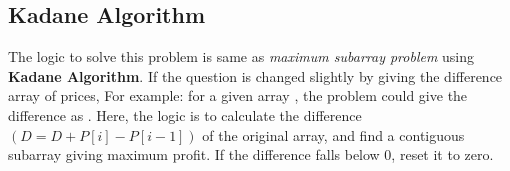\subsection{Kadane Algorithm}
The logic to solve this problem is same as \textit{maximum subarray problem} using \textbf{Kadane Algorithm}. If the question is changed slightly by giving the difference array of prices, For example: for a given array \fcj{[1,7,,4,11]}, the problem could give the difference as \fcj{[0,6,-3,7]}. Here, the logic is to calculate the difference $( D = D + P[i] - P[i-1])$ of the original array, and find a contiguous subarray giving maximum profit. If the difference falls below 0, reset it to zero.

